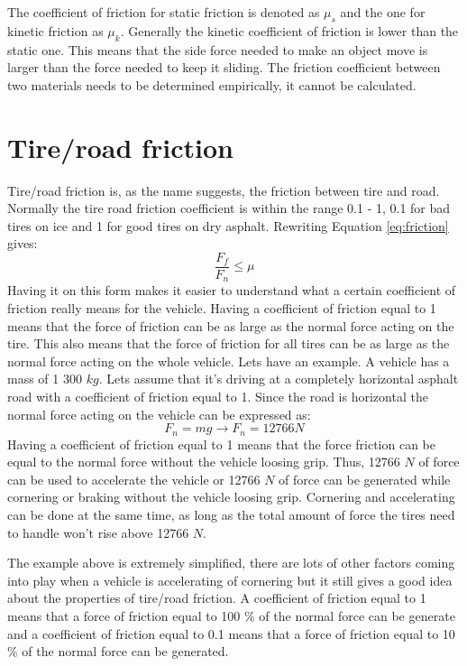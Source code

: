 The coefficient of friction for static friction is denoted as $ \mu_{s} $ and the one for kinetic friction as $ \mu_{k} $. Generally the kinetic coefficient of friction is lower than the static one. This means that the side force needed to make an object move is larger than the force needed to keep it sliding. The friction coefficient between two materials needs to be determined empirically, it cannot be calculated. 

\section{Tire/road friction}
Tire/road friction is, as the name suggests, the friction between tire and road. Normally the tire road friction coefficient is within the range 0.1 - 1, 0.1 for bad tires on ice and 1 for good tires on dry asphalt. Rewriting Equation \ref{eq:friction} gives:
\begin{equation} \label{eq:friction2}
\frac{F_{f}}{F_{n}} \leq\mu
\end{equation}
Having it on this form makes it easier to understand what a certain coefficient of friction really means for the vehicle. Having a coefficient of friction equal to 1 means that the force of friction can be as large as the normal force acting on the tire. This also means that the force of friction for all tires can be as large as the normal force acting on the whole vehicle. Lets have an example. A vehicle has a mass of 1 300 $ kg $. Lets assume that it's driving at a completely horizontal asphalt road with a coefficient of friction equal to 1. Since the road is horizontal the normal force acting on the vehicle can be expressed as:
\begin{equation} \label{eq:friction3}
F_{n}=mg \rightarrow F_{n} = 12766 N 
\end{equation}
Having a coefficient of friction equal to 1 means that the force friction can be equal to the normal force without the vehicle loosing grip. Thus, 12766 $ N $ of force can be used to accelerate the vehicle or 12766 $ N $ of force can be generated while cornering or braking without the vehicle loosing grip. Cornering and accelerating can be done at the same time, as long as the total amount of force the tires need to handle won't rise above 12766 $ N $.

The example above is extremely simplified, there are lots of other factors coming into play when a vehicle is accelerating of cornering but it still gives a good idea about the properties of tire/road friction. A coefficient of friction equal to 1 means that a force of friction equal to 100 $ \% $ of the normal force can be generate and a coefficient of friction equal to 0.1 means that a force of friction equal to 10 $ \% $ of the normal force can be generated.

